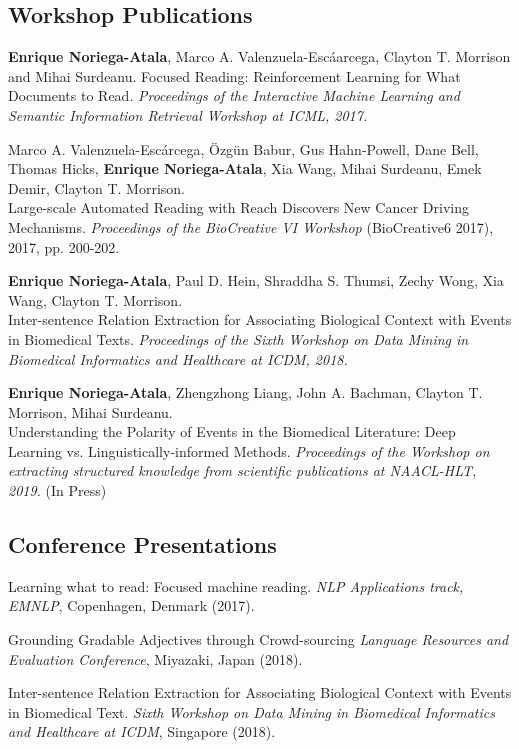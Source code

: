 \documentclass[letterpaper]{article}
\renewenvironment{itemize}{
  \begin{list}{}{
    \setlength{\leftmargin}{1.5em}
  }
}{
  \end{list}
}
\begin{document}
\subsection*{Workshop Publications}
\begin{itemize}
	\item \textbf{Enrique Noriega-Atala}, Marco A. Valenzuela-Esc\'a{a}rcega, Clayton T. Morrison and Mihai Surdeanu. Focused Reading: Reinforcement Learning for What Documents to Read. \textit{Proceedings of the Interactive Machine Learning and Semantic Information Retrieval Workshop at ICML, 2017.}
	\item Marco A. Valenzuela-Esc\'{a}rcega, \"{O}zg\"{u}n Babur, Gus Hahn-Powell, Dane Bell, Thomas Hicks, \textbf{Enrique Noriega-Atala}, Xia Wang, Mihai Surdeanu, Emek Demir, Clayton T. Morrison. \\Large-scale Automated Reading with Reach Discovers New Cancer Driving Mechanisms. \textit{Proceedings of the BioCreative VI Workshop} (BioCreative6 2017), 2017, pp. 200-202.
	\item \textbf{Enrique Noriega-Atala}, Paul D. Hein, Shraddha S. Thumsi, Zechy Wong, Xia Wang, Clayton T. Morrison. \\ Inter-sentence Relation Extraction for Associating Biological Context with Events in Biomedical Texts. \textit{Proceedings of the Sixth Workshop on Data Mining in Biomedical Informatics and Healthcare at ICDM, 2018.}
	\item \textbf{Enrique Noriega-Atala}, Zhengzhong Liang, John A. Bachman, Clayton T. Morrison, Mihai Surdeanu.\\ Understanding the Polarity of Events in the Biomedical Literature: Deep Learning vs. Linguistically-informed Methods. \textit{Proceedings of the Workshop on extracting structured knowledge from scientific publications at NAACL-HLT, 2019.} (In Press) 

\end{itemize}

\subsection*{Conference Presentations}

\begin{itemize}
	
\item Learning what to read: Focused machine reading. \textit{NLP Applications track, EMNLP}, Copenhagen, Denmark (2017).
\item Grounding Gradable Adjectives through Crowd-sourcing \textit{Language Resources and Evaluation Conference}, Miyazaki, Japan (2018).
\item Inter-sentence Relation Extraction for Associating Biological Context with Events in Biomedical Text. \textit{Sixth Workshop on Data Mining in Biomedical Informatics and Healthcare at ICDM}, Singapore (2018).
\end{itemize}
\end{document}
